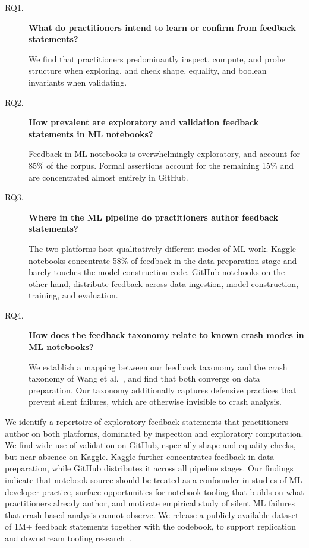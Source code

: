 \documentclass[a4paper,USenglish,cleveref,autoref,thm-restate,anonymous]{lipics-v2021}       %
\begin{document}
\begin{description}
  \item[RQ1.] \textbf{What do practitioners intend to learn or confirm from feedback statements?}

    We find that
    practitioners predominantly inspect, compute, and probe structure when exploring,
    and check shape, equality, and boolean invariants when validating.

  \item[RQ2.] \textbf{How prevalent are exploratory and validation feedback statements in ML notebooks?}

    Feedback in ML notebooks is overwhelmingly exploratory,
    and account for 85\% of the corpus.
    Formal assertions account for the remaining 15\%
    and are concentrated almost entirely in GitHub.

  \item[RQ3.] \textbf{Where in the ML pipeline do practitioners author feedback statements?}

    The two platforms host qualitatively different modes of ML work.
    Kaggle notebooks concentrate 58\% of feedback in the data preparation stage
    and barely touches the model construction code.
    GitHub notebooks on the other hand,
    distribute feedback across data ingestion, model construction, training, and evaluation.

  \item[RQ4.] \textbf{How does the feedback taxonomy relate to known crash modes in ML notebooks?}

    We establish a mapping between our feedback taxonomy
    and the crash taxonomy of Wang et al.~\cite{wang2025why},
    and find that both converge on data preparation.
    Our taxonomy additionally captures defensive practices
    that prevent silent failures,
    which are otherwise invisible to crash analysis.
\end{description}

We identify a repertoire of exploratory feedback statements
that practitioners author on both platforms,
dominated by inspection and exploratory computation.
We find wide use of validation on GitHub,
especially shape and equality checks,
but near absence on Kaggle.
Kaggle further concentrates feedback in data preparation,
while GitHub distributes it across all pipeline stages.
Our findings indicate that notebook source
should be treated as a confounder in studies of ML developer practice,
surface opportunities for notebook tooling
that builds on what practitioners already author,
and motivate empirical study of silent ML failures
that crash-based analysis cannot observe.
We release a publicly available dataset
of 1M+ feedback statements
together with the codebook,
to support replication and downstream tooling research~\cite{replication}.
\end{document}
